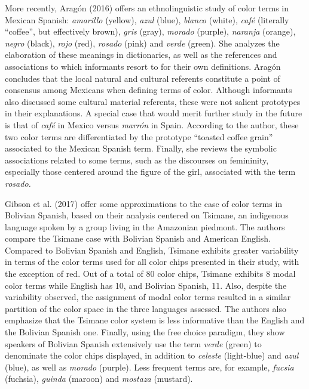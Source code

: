 \documentclass[
  english,
  ,man,floatsintext]{apa6}
\begin{document}
More recently, Aragón (2016) offers an ethnolinguistic study of color terms in Mexican Spanish: \emph{amarillo} (yellow), \emph{azul} (blue), \emph{blanco} (white), \emph{café} (literally \enquote{coffee}, but effectively brown), \emph{gris} (gray), \emph{morado} (purple), \emph{naranja} (orange), \emph{negro} (black), \emph{rojo} (red), \emph{rosado} (pink) and \emph{verde} (green). She analyzes the elaboration of these meanings in dictionaries, as well as the references and associations to which informants resort to for their own definitions. Aragón concludes that the local natural and cultural referents constitute a point of consensus among Mexicans when defining terms of color. Although informants also discussed some cultural material referents, these were not salient prototypes in their explanations. A special case that would merit further study in the future is that of \emph{café} in Mexico versus \emph{marrón} in Spain. According to the author, these two color terms are differentiated by the prototype \enquote{toasted coffee grain} associated to the Mexican Spanish term. Finally, she reviews the symbolic associations related to some terms, such as the discourses on femininity, especially those centered around the figure of the girl, associated with the term \emph{rosado.}

Gibson et al. (2017) offer some approximations to the case of color terms in Bolivian Spanish, based on their analysis centered on Tsimane, an indigenous language spoken by a group living in the Amazonian piedmont. The authors compare the Tsimane case with Bolivian Spanish and American English. Compared to Bolivian Spanish and English, Tsimane exhibits greater variability in terms of the color terms used for all color chips presented in their study, with the exception of red. Out of a total of 80 color chips, Tsimane exhibits 8 modal color terms while English has 10, and Bolivian Spanish, 11. Also, despite the variability observed, the assignment of modal color terms resulted in a similar partition of the color space in the three languages assessed. The authors also emphasize that the Tsimane color system is less informative than the English and the Bolivian Spanish one. Finally, using the free choice paradigm, they show speakers of Bolivian Spanish extensively use the term \emph{verde} (green) to denominate the color chips displayed, in addition to \emph{celeste} (light-blue) and \emph{azul} (blue), as well as \emph{morado} (purple). Less frequent terms are, for example, \emph{fucsia} (fuchsia), \emph{guinda} (maroon) and \emph{mostaza} (mustard).
\end{document}
